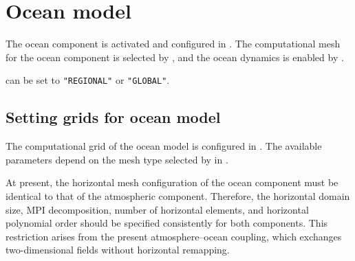 \section{Ocean model} \label{sec:basic_usel_ocean}

The ocean component is activated and configured in .
The computational mesh for the ocean component is selected by , 
and the ocean dynamics is enabled by .


 can be set to \verb|"REGIONAL"| or \verb|"GLOBAL"|.


\subsection{Setting grids for ocean model}
\label{subsec:ocean_mesh}

The computational grid of the ocean model is configured in .
The available parameters depend on the mesh type selected by  in .

At present, the horizontal mesh configuration of the ocean component must be identical to that of the atmospheric component.
Therefore, the horizontal domain size, MPI decomposition, number of horizontal elements, and horizontal polynomial order should be specified consistently for both components.
This restriction arises from the present atmosphere--ocean coupling,
which exchanges two-dimensional fields without horizontal remapping.


